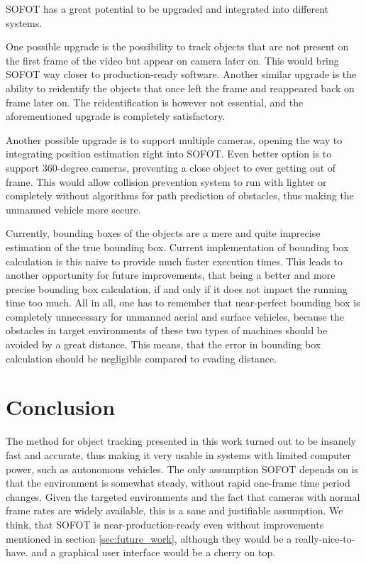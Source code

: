\documentclass[10pt,twocolumn,letterpaper]{article}
\begin{document}
SOFOT has a great potential to be upgraded and integrated into different systems.

One possible upgrade is the possibility to track objects that are not present on the
first frame of the video but appear on camera later on. This would bring SOFOT way closer
to production-ready software. Another similar upgrade is the ability to reidentify
the objects that once left the frame and reappeared back on frame later on. The reidentification
is however not essential, and the aforementioned upgrade is completely satisfactory.

Another possible upgrade is to support multiple cameras, opening the way to integrating
position estimation right into SOFOT. Even better option is to support 360-degree cameras,
preventing a close object to ever getting out of frame. This would allow collision
prevention system to run with lighter or completely without algorithms for path prediction
of obstacles, thus making the unmanned vehicle more secure.

Currently, bounding boxes of the objects are a mere and quite imprecise estimation of the true
bounding box. Current implementation of bounding box calculation is this naive to provide much faster execution
times. This leads to another opportunity for future improvements, that being a better and
more precise bounding box calculation, if and only if it does not impact the running
time too much. All in all, one has to remember that near-perfect bounding box is completely
unnecessary for unmanned aerial and surface vehicles, because the obstacles in target environments
of these two types of machines should be avoided by a great distance. This means, that the error
in bounding box calculation should be negligible compared to evading distance.



\section{Conclusion}

The method for object tracking presented in this work turned out to be insanely fast
and accurate, thus making it very usable in systems with limited computer power, such as
autonomous vehicles. The only assumption SOFOT depends on is that the environment is
somewhat steady, without rapid one-frame time period changes. Given the targeted environments
and the fact that cameras with normal frame rates are widely available, this is a sane and
justifiable assumption. We think, that SOFOT is near-production-ready even without
improvements mentioned in section \ref{sec:future_work}, although they would be a really-nice-to-have.
and a graphical user interface would be a cherry on top.
\end{document}
